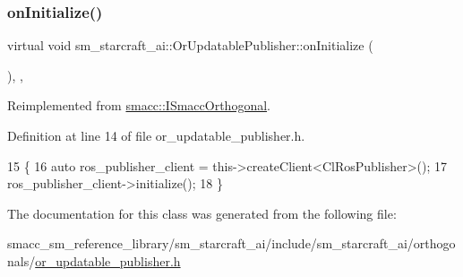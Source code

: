 \subsubsection{\texorpdfstring{on\+Initialize()}{onInitialize()}}
{\footnotesize\ttfamily virtual void sm\+\_\+starcraft\+\_\+ai\+::\+Or\+Updatable\+Publisher\+::on\+Initialize (\begin{DoxyParamCaption}{ }\end{DoxyParamCaption})\hspace{0.3cm}{\ttfamily [inline]}, {\ttfamily [override]}, {\ttfamily [virtual]}}



Reimplemented from \hyperlink{classsmacc_1_1ISmaccOrthogonal_a6bb31c620cb64dd7b8417f8705c79c7a}{smacc\+::\+I\+Smacc\+Orthogonal}.



Definition at line 14 of file or\+\_\+updatable\+\_\+publisher.\+h.


\begin{DoxyCode}
15     \{
16         \textcolor{keyword}{auto} ros\_publisher\_client = this->createClient<ClRosPublisher>();
17         ros\_publisher\_client->initialize();
18     \}
\end{DoxyCode}


The documentation for this class was generated from the following file\+:\begin{DoxyCompactItemize}
\item 
smacc\+\_\+sm\+\_\+reference\+\_\+library/sm\+\_\+starcraft\+\_\+ai/include/sm\+\_\+starcraft\+\_\+ai/orthogonals/\hyperlink{sm__starcraft__ai_2include_2sm__starcraft__ai_2orthogonals_2or__updatable__publisher_8h}{or\+\_\+updatable\+\_\+publisher.\+h}\end{DoxyCompactItemize}
